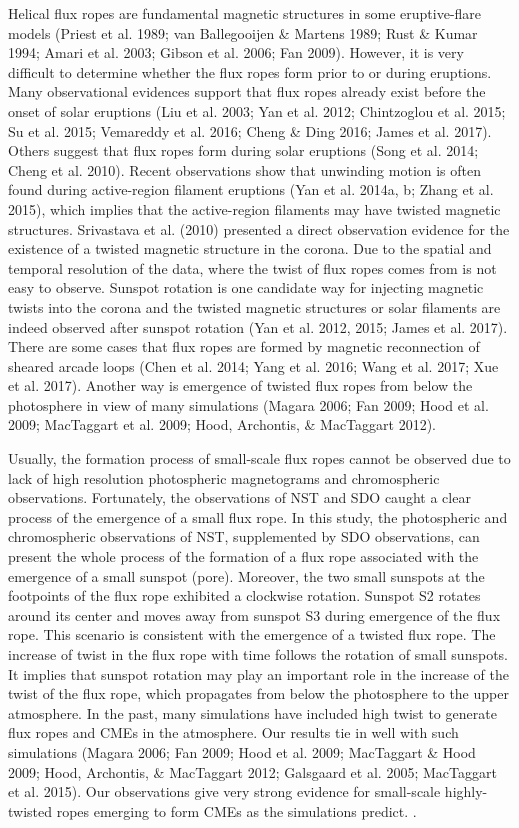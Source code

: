 \documentclass[12pt,preprint]{aastex}
\begin{document}
\begin{CJK*}{UTF8}{gbsn}
Helical flux ropes are fundamental magnetic structures in some eruptive-flare models (Priest et al. 1989; van Ballegooijen \& Martens 1989; Rust \& Kumar 1994; Amari et al. 2003; Gibson et al. 2006; Fan 2009). However, it is very difficult to determine whether the flux ropes form prior to or during eruptions. Many observational evidences support that flux ropes already exist before the onset of solar eruptions (Liu et al. 2003; Yan et al. 2012; Chintzoglou et al. 2015; Su et al. 2015; Vemareddy et al. 2016; Cheng \& Ding 2016; James et al. 2017).  Others suggest that flux ropes form during solar eruptions (Song et al. 2014; Cheng et al. 2010). Recent observations show that unwinding motion is often found during active-region filament eruptions (Yan et al. 2014a, b; Zhang et al. 2015), which implies that the active-region filaments may have twisted magnetic structures. Srivastava et al. (2010) presented a direct observation evidence for the existence of a twisted magnetic structure in the corona. Due to the spatial and temporal resolution of the data, where the twist of flux ropes comes from is not easy to observe. Sunspot rotation is one candidate way for injecting magnetic twists into the corona and the twisted magnetic structures or solar filaments are indeed observed after sunspot rotation (Yan et al. 2012, 2015; James et al. 2017). There are some cases that  flux ropes are formed by magnetic reconnection of sheared arcade loops (Chen et al. 2014; Yang et al. 2016; Wang et al. 2017; Xue et al. 2017). Another way is emergence of twisted flux ropes from below the photosphere in view of many simulations (Magara 2006; Fan 2009; Hood et al. 2009; MacTaggart et al. 2009; Hood, Archontis, \& MacTaggart 2012).

Usually, the formation process of small-scale flux ropes cannot be observed due to lack of high resolution photospheric magnetograms and chromospheric observations. Fortunately, the observations of NST and SDO caught a clear process of the emergence of a small flux rope. In this study, the photospheric and chromospheric observations of NST, supplemented by SDO observations, can present the whole process of the formation of a flux rope associated with the emergence of a small sunspot (pore). Moreover, the two small sunspots at the footpoints of the flux rope exhibited a clockwise rotation. Sunspot S2 rotates around its center and moves away from sunspot S3 during emergence of the flux rope. This scenario is consistent with the emergence of a twisted flux rope. The increase of twist in the flux rope with time follows the rotation of small sunspots. It implies that sunspot rotation may play an important role in the increase of the twist of the flux rope, which propagates from below the photosphere to the upper atmosphere. In the past, many simulations have included high twist to generate flux ropes and CMEs in the atmosphere. Our results tie in well with such simulations (Magara 2006; Fan 2009; Hood et al. 2009; MacTaggart \& Hood 2009; Hood, Archontis, \& MacTaggart 2012; Galsgaard et al. 2005; MacTaggart et al. 2015). Our observations give very strong evidence for small-scale highly-twisted ropes emerging to form CMEs as the simulations predict.
.


\end{CJK*}
\end{document}
